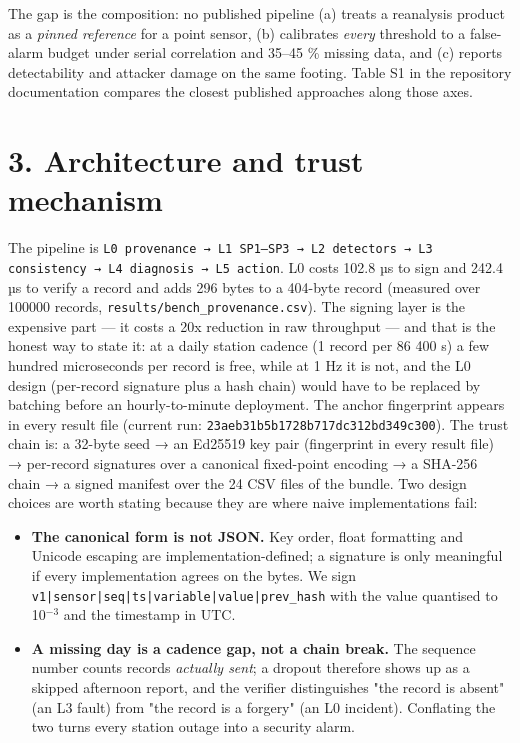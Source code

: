 \documentclass[10pt,a4paper]{article}
\begin{document}
The gap is the composition: no published pipeline (a) treats a reanalysis product as a \emph{pinned reference} for a point sensor, (b) calibrates \emph{every} threshold to a false-\allowbreak{}alarm budget under serial correlation and 35–45 \% missing data, and (c) reports detectability and attacker damage on the same footing. Table S1 in the repository documentation compares the closest published approaches along those axes.

\section*{3. Architecture and trust mechanism}
The pipeline is \texttt{L0 provenance → L1 SP1–SP3 → L2 detectors → L3 consistency → L4 diagnosis → L5 action}. L0 costs 102.8 µs to sign and 242.4 µs to verify a record and adds 296 bytes to a 404-\allowbreak{}byte record (measured over 100000 records, \texttt{results/\allowbreak{}bench\_\allowbreak{}provenance.csv}). The signing layer is the expensive part — it costs a 20x reduction in raw throughput — and that is the honest way to state it: at a daily station cadence (1 record per 86 400 s) a few hundred microseconds per record is free, while at 1 Hz it is not, and the L0 design (per-\allowbreak{}record signature plus a hash chain) would have to be replaced by batching before an hourly-\allowbreak{}to-\allowbreak{}minute deployment. The anchor fingerprint appears in every result file (current run: \texttt{23aeb31b5b1728b717dc312bd349c300}). The trust chain is: a 32-\allowbreak{}byte seed → an Ed25519 key pair (fingerprint in every result file) → per-\allowbreak{}record signatures over a canonical fixed-\allowbreak{}point encoding → a SHA-\allowbreak{}256 chain → a signed manifest over the 24 CSV files of the bundle. Two design choices are worth stating because they are where naive implementations fail:

\begin{itemize}
\item \textbf{The canonical form is not JSON.} Key order, float formatting and Unicode
escaping are implementation-\allowbreak{}defined; a signature is only meaningful if every implementation agrees on the bytes. We sign \texttt{v1|\allowbreak{}sensor|\allowbreak{}seq|\allowbreak{}ts|\allowbreak{}variable|\allowbreak{}value|\allowbreak{}prev\_\allowbreak{}hash} with the value quantised to 10$^{-3}$ and the timestamp in UTC.

\item \textbf{A missing day is a cadence gap, not a chain break.} The sequence number
counts records \emph{actually sent}; a dropout therefore shows up as a skipped afternoon report, and the verifier distinguishes "the record is absent" (an L3 fault) from "the record is a forgery" (an L0 incident). Conflating the two turns every station outage into a security alarm.

\end{itemize}
\end{document}
